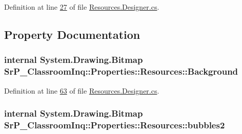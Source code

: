 \-Definition at line \hyperlink{_resources_8_designer_8cs_source_l00027}{27} of file \hyperlink{_resources_8_designer_8cs_source}{\-Resources.\-Designer.\-cs}.



\subsection{\-Property \-Documentation}
\hypertarget{class_sr_p___classroom_inq_1_1_properties_1_1_resources_a16ac92929f55281abad59488efae062b}{
\subsubsection[{\-Background}]{\setlength{\rightskip}{0pt plus 5cm}internal \-System.\-Drawing.\-Bitmap \-Sr\-P\-\_\-\-Classroom\-Inq\-::\-Properties\-::\-Resources\-::\-Background}}
\label{class_sr_p___classroom_inq_1_1_properties_1_1_resources_a16ac92929f55281abad59488efae062b}


\-Definition at line \hyperlink{_resources_8_designer_8cs_source_l00063}{63} of file \hyperlink{_resources_8_designer_8cs_source}{\-Resources.\-Designer.\-cs}.

\hypertarget{class_sr_p___classroom_inq_1_1_properties_1_1_resources_ae15d966afaa44ab7f083fa1bb1cf1c82}{
\subsubsection[{bubbles2}]{\setlength{\rightskip}{0pt plus 5cm}internal \-System.\-Drawing.\-Bitmap \-Sr\-P\-\_\-\-Classroom\-Inq\-::\-Properties\-::\-Resources\-::bubbles2}}
\label{class_sr_p___classroom_inq_1_1_properties_1_1_resources_ae15d966afaa44ab7f083fa1bb1cf1c82}


